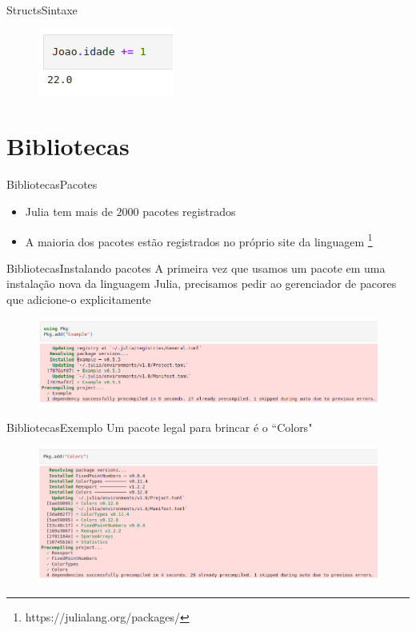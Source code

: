 \documentclass{beamer}
\begin{document}
\begin{frame}{Structs}{Sintaxe}
    \begin{figure}
        \centering
        \includegraphics[scale=0.4]{imagens/struct-ex06.png}
        \label{fig:my_label}
    \end{figure}     
\end{frame}


\section{Bibliotecas}

\begin{frame}{Bibliotecas}{Pacotes}
    \begin{itemize}
        \item Julia tem mais de $2000$ pacotes registrados
        \item A maioria dos pacotes estão registrados no próprio site da linguagem \footnote{https://julialang.org/packages/}
    \end{itemize}
\end{frame}

\begin{frame}{Bibliotecas}{Instalando pacotes}
    A primeira vez que usamos um pacote em uma instalação nova da linguagem Julia, precisamos pedir ao gerenciador de pacores que adicione-o explicitamente
    \begin{figure}
        \centering
        \includegraphics[scale=0.34]{imagens/pacotes-ex01.png}
        \label{fig:my_label}
    \end{figure}
\end{frame}

\begin{frame}{Bibliotecas}{Exemplo}
    Um pacote legal para brincar é o ``Colors"
    \begin{figure}
        \centering
        \includegraphics[scale=0.34]{imagens/colors.png}
        \label{fig:my_label}
    \end{figure}
\end{frame}
\end{document}
